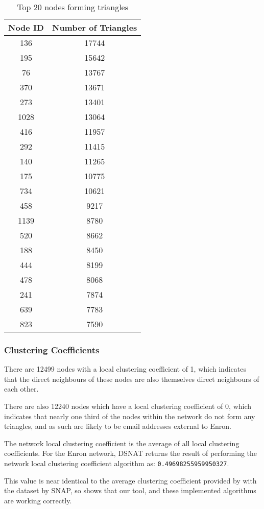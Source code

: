 \begin{table}[htbp]%
\centering
\begin{tabular}{|c|c|}
\hline
Node ID & Number of Triangles \\
\hline
136 & 17744 \\
195 & 15642 \\
76 & 13767 \\
370 & 13671 \\
273 & 13401 \\
1028 & 13064 \\
416 & 11957 \\
292 & 11415 \\
140 & 11265 \\
175 & 10775 \\
734 & 10621 \\
458 & 9217 \\
1139 & 8780 \\
520 & 8662 \\
188 & 8450 \\
444 & 8199 \\
478 & 8068 \\
241 & 7874 \\
639 & 7783 \\
823 & 7590 \\
\hline
\end{tabular}
\caption{Top 20 nodes forming triangles}
\label{tab:enrontriangles}
\end{table}

\subsubsection{Clustering Coefficients}
There are 12499 nodes with a local clustering coefficient of 1, which indicates that the direct neighbours of these nodes are also themselves direct neighbours of each other.

There are also 12240 nodes which have a local clustering coefficient of 0, which indicates that nearly one third of the nodes within the network do not form any triangles, and as such are likely to be email addresses external to Enron.

The network local clustering coefficient is the average of all local clustering coefficients. For the Enron network, DSNAT returns the result of performing the network local clustering coefficient algorithm as: {\tt 0.49698255959950327}.

This value is near identical to the average clustering coefficient provided by with the dataset by SNAP, so shows that our tool, and these implemented algorithms are working correctly.

